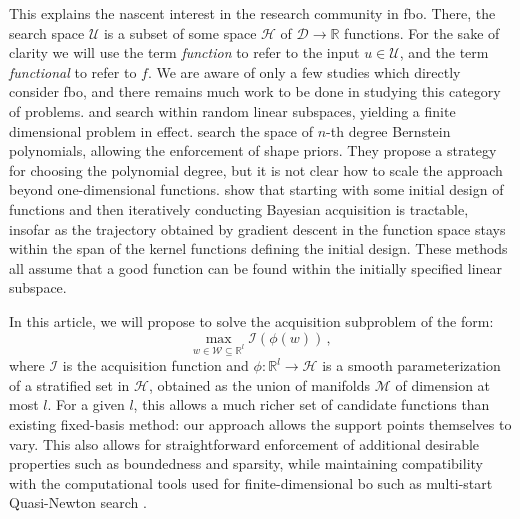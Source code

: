 \documentclass{article}
\newcommand{\R}{\mathbb{R}}
\newcommand{\U}{\mathcal{U}} %
\newcommand{\D}{\mathcal{D}} %
\newcommand{\Hs}{\mathcal{H}}
\newcommand{\acq}{\mathcal{I}}
\newcommand{\vu}{u}
\newcommand{\todo}[1]{{\color{red} TODO: #1}}
\begin{document}

This explains the nascent interest in the research community in \gls{fbo}.
There, the search space $\U$ is a subset of some space $\Hs$ of $\D\to\mathbb{R}$ functions.
For the sake of clarity we will use the term \emph{function} to refer to the input $\vu\in\mathcal{U}$, and the term \emph{functional} to refer to $f$.
We are aware of only a few studies which directly consider \gls{fbo}, and there remains much work to be done in studying this category of problems.
\cite{shilton2020sequential} and \cite{kundu2025active} search within random linear subspaces, yielding a finite dimensional problem in effect.
\cite{vellanki2019bayesian} search the space of $n$-th degree Bernstein polynomials, allowing the enforcement of shape priors. They propose a strategy for choosing the polynomial degree, but it is not clear how to scale the approach beyond one-dimensional functions.
\cite{vien2018bayesian} show that starting with some initial design of functions and then iteratively conducting Bayesian acquisition is tractable, insofar as the trajectory obtained by gradient descent in the function space stays within the span of the kernel functions defining the initial design. 
These methods all assume that a good function can be found within the initially specified linear subspace.

In this article, we will propose to solve the acquisition subproblem of the form: 
\begin{equation}
    \max_{w\in\mathcal{W}\subseteq \R^l}
    \acq \left(\phi(w) \right) \,,
\end{equation}
where $\acq$ is the acquisition function and $\phi: \R^l \to \Hs$ is a smooth parameterization of a stratified set in $\Hs$, obtained as the union of manifolds $\mathcal{M}$ of dimension at most $l$. 
For a given $l$, this allows a much richer set of candidate functions than existing fixed-basis method: our approach allows the support points themselves to vary.
This also allows for straightforward enforcement of additional desirable properties such as boundedness and sparsity, while maintaining compatibility with the computational tools used for finite-dimensional \gls{bo} such as multi-start Quasi-Newton search \cite[Chapter 7]{gramacy2020surrogates}.
\end{document}
